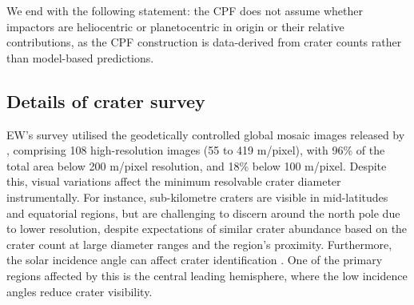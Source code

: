 \documentclass[preprint,12pt,3p,times,authoryear]{elsarticle}
\begin{document}
We end with the following statement: the CPF does not assume whether impactors are heliocentric or planetocentric in origin or their relative contributions, as the CPF construction is data-derived from crater counts rather than model-based predictions.



\subsection{Details of crater survey}
\label{app:survey}
EW’s survey utilised the geodetically controlled global mosaic images released by \citet{Bland2018}, comprising 108 high-resolution images (55 to 419 m/pixel), with 96\% of the total area below 200 m/pixel resolution, and 18\% below 100 m/pixel. Despite this, visual variations affect the minimum resolvable crater diameter instrumentally. For instance, sub-kilometre craters are visible in mid-latitudes and equatorial regions, but are challenging to discern around the north pole due to lower resolution, despite expectations of similar crater abundance based on the crater count at large diameter ranges and the region’s proximity. Furthermore, the solar incidence angle can affect crater identification \citep{Ostrach2011}. One of the primary regions affected by this is the central leading hemisphere, where the low incidence angles reduce crater visibility.\\
\end{document}
